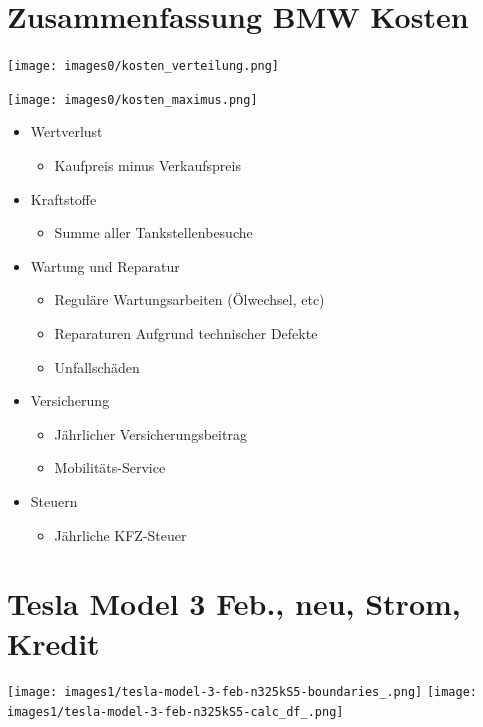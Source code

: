 \documentclass[landscape, DIV=99, 14pt]{scrartcl}
\begin{document}

\twocolumn
\section*{Zusammenfassung BMW Kosten}
\null
\vspace{1cm}
\begin{center}
\texttt{[image: images0/kosten\_verteilung.png]}
\end{center}

\texttt{[image: images0/kosten\_maximus.png]}

\pagebreak

\begin{itemize}
    \item Wertverlust
    \begin{itemize}
        \item Kaufpreis minus Verkaufspreis
    \end{itemize}
    \item Kraftstoffe
    \begin{itemize}
        \item Summe aller Tankstellenbesuche
    \end{itemize}
    \item Wartung und Reparatur
    \begin{itemize}
        \item Regul\"are Wartungsarbeiten (\"Olwechsel, etc)
        \item Reparaturen Aufgrund technischer Defekte
        \item Unfallsch\"aden
    \end{itemize}
    \item Versicherung
    \begin{itemize}
        \item J\"ahrlicher Versicherungsbeitrag
        \item Mobilit\"ats-Service
    \end{itemize}
    \item Steuern
    \begin{itemize}
            \item J\"ahrliche KFZ-Steuer
    \end{itemize}
\end{itemize}


\twocolumn

\section*{Tesla Model 3 Feb., neu, Strom, Kredit}
\begin{center}
\texttt{[image: images1/tesla-model-3-feb-n325kS5-boundaries\_.png]}
\null
\vspace{0.5cm}
\texttt{[image: images1/tesla-model-3-feb-n325kS5-calc\_df\_.png]}
\end{center}
\end{document}
